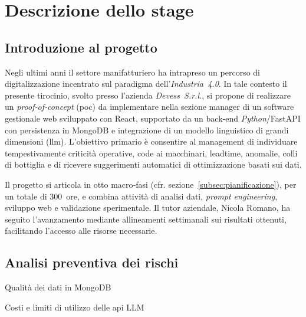 \chapter{Descrizione dello stage}
\label{chap:descrizione-stage}

\section{Introduzione al progetto}

Negli ultimi anni il settore manifatturiero ha intrapreso un percorso di digitalizzazione incentrato sul paradigma dell’\textit{Industria~4.0}. In tale contesto il presente 
tirocinio, svolto presso l’azienda \textit{Devess~S.r.l.}, si propone di realizzare un \textit{proof‑of‑concept} (\gls{poc}) da implementare nella sezione manager di un software gestionale web sviluppato con React, supportato da un back‑end \textit{Python}/FastAPI con persistenza in MongoDB e integrazione di un modello linguistico di grandi 
dimensioni (\gls{llm}). L’obiettivo primario è consentire al management di individuare tempestivamente criticità operative, code ai macchinari, \gls{leadtime}, anomalie, colli di 
bottiglia e di ricevere suggerimenti automatici di ottimizzazione basati sui dati.

Il progetto si articola in otto macro‑fasi (cfr. sezione~\ref{subsec:pianificazione}), per un totale di 300~ore, e combina attività di analisi dati, \textit{prompt engineering}, 
sviluppo web e validazione sperimentale. Il tutor aziendale, Nicola Romano, ha seguito l’avanzamento mediante allineamenti settimanali sui risultati ottenuti, 
facilitando l’accesso alle risorse necessarie.

\section{Analisi preventiva dei rischi}

\begin{risk}{Qualità dei dati in MongoDB}
\end{risk}

\begin{risk}{Costi e limiti di utilizzo delle \gls{api} LLM}
\end{risk}

